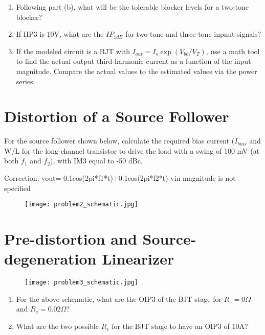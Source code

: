\begin{enumerate}[label=(\alph*)]
    \item {\color{blue} Following part (b), what will be the tolerable blocker levels for a two-tone blocker?}

    \item {\color{blue} If IIP3 is 10V, what are the $IP_{1dB}$ for two-tone and three-tone inpnut signals?}

    \item {\color{blue} If the modeled circuit is a BJT with $I_{out} = I_s \exp(V_{be}/V_{T})$, use a math tool to find the actual output third-harmonic current as a function of the input magnitude. Compare the actual values to the estimated values via the power series.}
\end{enumerate}

\section{Distortion of a Source Follower}
{\color{blue} For the source follower shown below, calculate the required bias current ($I_{bias}$ and W/L for the long-channel transistor to drive the load with a swing of 100 mV (at both $f_1$ and $f_2$), with IM3 equal to -50 dBc.}

{\color{red} Correction: vout= 0.1cos(2pi*f1*t)+0.1cos(2pi*f2*t) vin magnitude is not specified}

\begin{figure}[H]
    \centering \texttt{[image: problem2\_schematic.jpg]}
\end{figure}

\section{Pre-distortion and Source-degeneration Linearizer}
\begin{figure}[H]
    \centering \texttt{[image: problem3\_schematic.jpg]}
\end{figure}

\begin{enumerate}[label=(\alph*)]
    \item {\color{blue} For the above schematic, what are the OIP3 of the BJT stage for $R_e = 0 \Omega$ and $R_e = 0.02 \Omega$?}

    \item {\color{blue} What are the two possible $R_e$ for the BJT stage to have an OIP3 of 10A?}
\end{enumerate}


